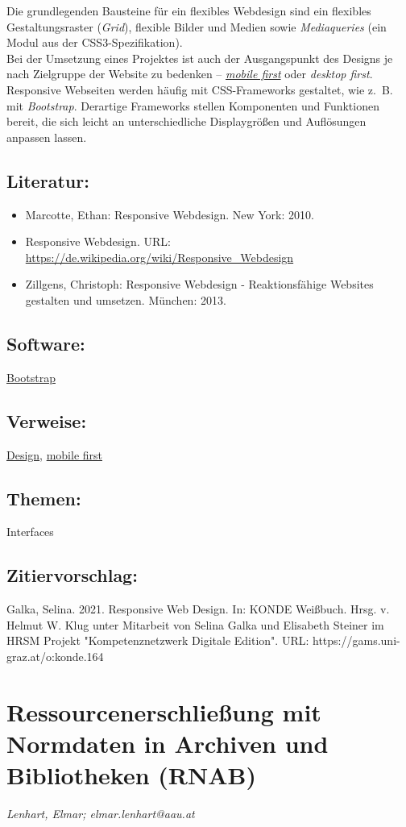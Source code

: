 \documentclass{article}
\begin{document}
        Die grundlegenden Bausteine für ein flexibles Webdesign sind ein flexibles Gestaltungsraster (\emph{Grid}), flexible Bilder und Medien sowie \emph{Mediaqueries} (ein Modul aus der CSS3-Spezifikation). \\
            
        Bei der Umsetzung eines Projektes ist auch der Ausgangspunkt des Designs je nach Zielgruppe der Website zu bedenken – \emph{\href{http://gams.uni-graz.at/o:konde.134}{mobile first}} oder \emph{desktop first}.\\
            
        Responsive Webseiten werden häufig mit CSS-Frameworks gestaltet, wie z. B. mit \emph{Bootstrap}. Derartige Frameworks stellen Komponenten und Funktionen bereit, die sich leicht an unterschiedliche Displaygrößen und Auflösungen anpassen lassen.\\
            
        \subsection*{Literatur:}\begin{itemize}\item Marcotte, Ethan: Responsive Webdesign. New York: 2010.\item Responsive Webdesign. URL: \url{https://de.wikipedia.org/wiki/Responsive_Webdesign}\item Zillgens, Christoph: Responsive Webdesign - Reaktionsfähige Websites gestalten und umsetzen. München: 2013.\end{itemize}\subsection*{Software:}\href{https://getbootstrap.com/}{Bootstrap}\subsection*{Verweise:}\href{https://gams.uni-graz.at/o:konde.56}{Design}, \href{https://gams.uni-graz.at/o:konde.134}{mobile first}\subsection*{Themen:}Interfaces\subsection*{Zitiervorschlag:}Galka, Selina. 2021. Responsive Web Design. In: KONDE Weißbuch. Hrsg. v. Helmut W. Klug unter Mitarbeit von Selina Galka und Elisabeth Steiner im HRSM Projekt "Kompetenznetzwerk Digitale Edition". URL: https://gams.uni-graz.at/o:konde.164\newpage\section*{Ressourcenerschließung mit Normdaten in Archiven und Bibliotheken (RNAB)} \emph{Lenhart, Elmar; elmar.lenhart@aau.at   }\\
        
\end{document}
